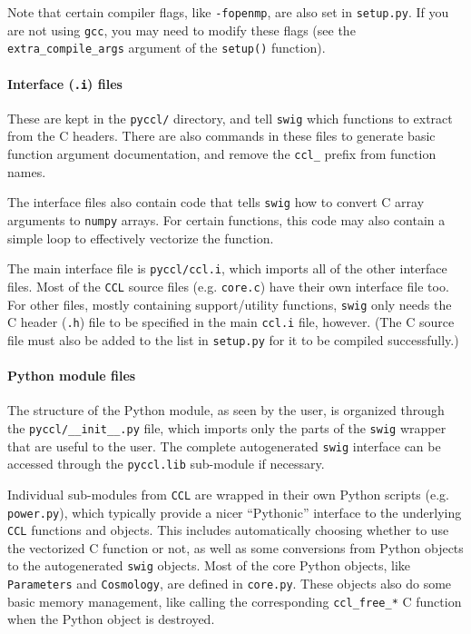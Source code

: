 \documentclass[\docopts]{\docclass}
\begin{document}
Note that certain compiler flags, like {\tt -fopenmp}, are also set in {\tt setup.py}. If you are not using {\tt gcc}, you may need to modify these flags (see the {\tt extra\_compile\_args} argument of the {\tt setup()} function).

\paragraph{Interface ({\tt .i}) files} These are kept in the {\tt pyccl/} directory, and tell {\tt swig} which functions to extract from the C headers. There are also commands in these files to generate basic function argument documentation, and remove the {\tt ccl\_} prefix from function names.

The interface files also contain code that tells {\tt swig} how to convert C array arguments to {\tt numpy} arrays. For certain functions, this code may also contain a simple loop to effectively vectorize the function.

The main interface file is {\tt pyccl/ccl.i}, which imports all of the other interface files. Most of the {\tt CCL} source files (e.g. {\tt core.c}) have their own interface file too. For other files, mostly containing support/utility functions, {\tt swig} only needs the C header ({\tt .h}) file to be specified in the main {\tt ccl.i} file, however. (The C source file must also be added to the list in {\tt setup.py} for it to be compiled successfully.)

\paragraph{Python module files} The structure of the Python module, as seen by the user, is organized through the {\tt pyccl/\_\_init\_\_.py} file, which imports only the parts of the {\tt swig} wrapper that are useful to the user. The complete autogenerated {\tt swig} interface can be accessed through the {\tt pyccl.lib} sub-module if necessary.

Individual sub-modules from {\tt CCL} are wrapped in their own Python scripts (e.g. {\tt power.py}), which typically provide a nicer ``Pythonic'' interface to the underlying {\tt CCL} functions and objects. This includes automatically choosing whether to use the vectorized C function or not, as well as some conversions from Python objects to the autogenerated {\tt swig} objects. Most of the core Python objects, like {\tt Parameters} and {\tt Cosmology}, are defined in {\tt core.py}. These objects also do some basic memory management, like calling the corresponding {\tt ccl\_free\_*} C function when the Python object is destroyed.
\end{document}
